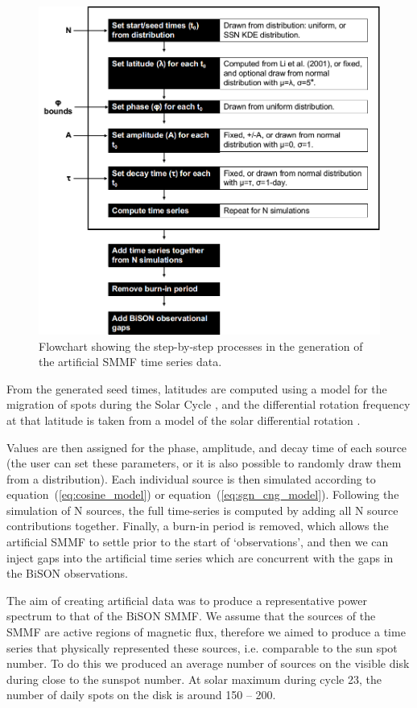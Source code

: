 \begin{figure}[ht!]
	\centering
	\includegraphics[width=0.85\columnwidth]{flow_chart_2.png}
	\caption{Flowchart showing the step-by-step processes in the generation of the artificial SMMF time series data.}
	\label{fig:flowchart}
\end{figure}


From the generated seed times, latitudes are computed using a model for the migration of spots during the Solar Cycle \citep{li_latitude_2001-1}, and the differential rotation frequency at that latitude is taken from a model of the solar differential rotation \citep{snodgrass_magnetic_1983}. 

Values are then assigned for the phase, amplitude, and decay time of each source (the user can set these parameters, or it is also possible to randomly draw them from a distribution). Each individual source is then simulated according to equation~(\ref{eq:cosine_model}) or equation~(\ref{eq:sgn_cng_model}). Following the simulation of N sources, the full time-series is computed by adding all N source contributions together. Finally, a burn-in period is removed, which allows the artificial SMMF to settle prior to the start of `observations', and then we can inject gaps into the artificial time series which are concurrent with the gaps in the BiSON observations.

The aim of creating artificial data was to produce a representative power spectrum to that of the BiSON SMMF. We assume that the sources of the SMMF are active regions of magnetic flux, therefore we aimed to produce a time series that physically represented these sources, i.e. comparable to the sun spot number. To do this we produced an average number of sources on the visible disk during close to the sunspot number. At solar maximum during cycle 23, the number of daily spots on the disk is around 150 -- 200. 

